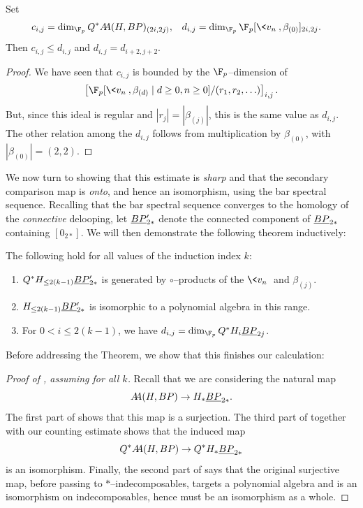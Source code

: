 \begin{corollary}
Set
\begin{align*}
c_{i,j} & = \dim_{\F_p} Q^* \AA(H, BP)_{(2i, 2j)}, &
d_{i,j} & = \dim_{\F_p} \F_p[\<v_n\>, \beta_{(0)}]_{2i,2j}.
\end{align*}
Then \(c_{i,j} \le d_{i,j}\) and \(d_{i,j} = d_{i+2,j+2}\).
\end{corollary}
\begin{proof}
We have seen that \(c_{i,j}\) is bounded by the \(\F_p\)--dimension of \[\left[\F_p[\<v_n\>, \beta_{(d)} \mid d \ge 0, n \ge 0] / (r_1, r_2, \ldots)\right]_{i,j}.\]
But, since this ideal is regular and \(|r_j| = |\beta_{(j)}|\), this is the same value as \(d_{i,j}\).
The other relation among the \(d_{i,j}\) follows from multiplication by \(\beta_{(0)}\), with \(|\beta_{(0)}| = (2, 2)\).
\end{proof}

We now turn to showing that this estimate is \emph{sharp} and that the secondary comparison map is \emph{onto}, and hence an isomorphism, using the bar spectral sequence.
Recalling that the bar spectral sequence converges to the homology of the \emph{connective} delooping, let \(\OS{BP}{2*}'\) denote the connected component of \(\OS{BP}{2*}\) containing \([0_{2*}]\).
We will then demonstrate the following theorem inductively:
\begin{theorem}\label{HFpBPCooperationsInduction}
The following hold for all values of the induction index \(k\):
\begin{enumerate}
\item \(Q^* H_{\le 2(k-1)} \OS{BP}{2*}'\) is generated by \(\circ\)--products of the \(\<v_n\>\) and \(\beta_{(j)}\).
\item \(H_{\le 2(k-1)} \OS{BP}{2*}'\) is isomorphic to a polynomial algebra in this range.
\item For \(0 < i \le 2(k-1)\), we have \(d_{i,j} = \dim_{\F_p} Q^* H_i \OS{BP}{2j}\).
\end{enumerate}
\end{theorem}

\noindent Before addressing the Theorem, we show that this finishes our calculation:
\begin{proof}[{Proof of , assuming  for all \(k\)}]
Recall that we are considering the natural map \[\AA(H, BP) \to H_* \OS{BP}{2*}.\]
The first part of  shows that this map is a surjection.
The third part of  together with our counting estimate shows that the induced map \[Q^* \AA(H, BP) \to Q^* H_* \OS{BP}{2*}\] is an isomorphism.
Finally, the second part of  says that the original surjective map, before passing to \(\ast\)--indecomposables, targets a polynomial algebra and is an isomorphism on indecomposables, hence must be an isomorphism as a whole.
\end{proof}

